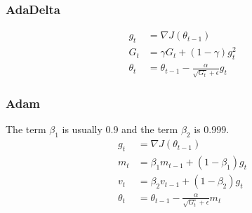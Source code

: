 \documentclass[journal, a4paper]{IEEEtran}
\begin{document}
\subsubsection{AdaDelta}
\begin{equation}
    \begin{aligned}
        g_t &= \nabla J(\theta_{t-1})\\
        G_t &= \gamma G_t + (1-\gamma)g_t^2\\
        \theta_t &= \theta_{t-1}-\frac{\alpha}{\sqrt{G_t}+\epsilon}g_t
    \end{aligned}
\end{equation}



\subsubsection{Adam}
The term $\beta_1$ is usually 0.9 and the term $\beta_2$ is 0.999.
\begin{equation}
    \begin{aligned}
        g_t &= \nabla J(\theta_{t-1})\\
        m_t &= \beta_1m_{t-1}+(1-\beta_1)g_t\\
        v_t &= \beta_2v_{t-1}+(1-\beta_2)g_t\\
        \theta_t &= \theta_{t-1}-\frac{\alpha}{\sqrt{G_t}+\epsilon}m_t
    \end{aligned}
\end{equation}


\end{document}
